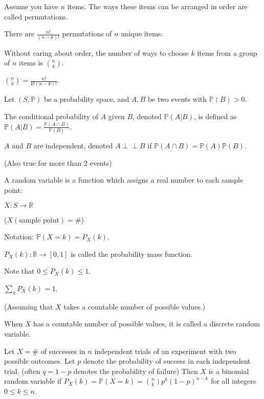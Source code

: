 \documentclass{article}
\newcommand{\indep}{\perp \!\!\! \perp}
\begin{document}
    Assume you have $n$ items. The ways these items can be arranged in order are called permutations.
    
    There are $\frac{n!}{(n-k)!}$ permutations of $n$ unique items.
    
\medskip
{}

    Without caring about order, the number of ways to choose $k$ items from a group of $n$ items is $n \choose k$.

    ${n \choose k} = \frac{n!}{k!(n-k)!}$.

\medskip
{}

    Let $(S,\mathbb P)$ be a probability space, and $A,B$ be two events with $\mathbb P(B) > 0$.
    
    The conditional probability of $A$ given $B$, denoted $\mathbb P(A|B)$, is defined as $\mathbb P(A|B) = \frac {\mathbb P(A \cap B)}{\mathbb P(B)}$.

\newpage
{}

    $A$ and $B$ are independent, denoted $A \indep B$ if $\mathbb P(A \cap B) = \mathbb P(A) \mathbb P(B)$.
    
    (Also true for more than 2 events)

\medskip
{}

    A random variable is a function which assigns a real number to each sample point:
    
        $X:S \to \mathbb R$
        
        ($X(\text{sample point}) = \#$)
        
        Notation: $\mathbb P(X = k) = P_X(k)$.

\medskip
{}

    $P_X(k):\mathbb R \to [0,1]$ is called the probability mass function.
    
    Note that $0 \leq P_X(k) \leq 1$.
    
    $\sum_kP_X(k)=1$.
    
    (Assuming that $X$ takes a countable number of possible values.)
    
    When $X$ has a countable number of possible values, it is called a discrete random variable.
    
\medskip
{}

    Let $X = \#$ of successes in $n$ independent trials of an experiment with two possible outcomes. Let $p$ denote the probability of success in each independent trial. (often $q=1-p$ denotes the probability of failure) Then $X$ is a binomial random variable if $P_X(k) = \mathbb P(X=k) = {n \choose k}p^k(1-p)^{n-k}$ for all integers $0 \leq k \leq n$.
\end{document}
